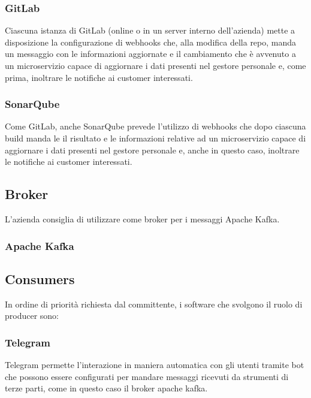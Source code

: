 		\subsubsection{GitLab}
		Ciascuna istanza di GitLab (online o in un server interno dell'azienda) mette a disposizione la configurazione di webhooks che, alla modifica della repo, manda un messaggio con le informazioni aggiornate e il cambiamento che è avvenuto a un microservizio capace di aggiornare i dati presenti nel gestore personale e, come prima, inoltrare le notifiche ai customer interessati.
		
		\subsubsection{SonarQube}
		Come GitLab, anche SonarQube prevede l'utilizzo di webhooks che dopo ciascuna build manda le il risultato e le informazioni relative ad un microservizio capace di aggiornare i dati presenti nel gestore personale e, anche in questo caso, inoltrare le notifiche ai customer interessati.
		
	\subsection{Broker}
	
		L'azienda consiglia di utilizzare come broker per i messaggi Apache Kafka.
	
		\subsubsection{Apache Kafka}
		
		
	
	\subsection{Consumers}
	
		In ordine di priorità richiesta dal committente, i software che svolgono il ruolo di producer sono:
	
		\subsubsection{Telegram}
		Telegram permette l'interazione in maniera automatica con gli utenti tramite bot che possono essere configurati per mandare messaggi ricevuti da strumenti di terze parti, come in questo caso il broker apache kafka.
		
